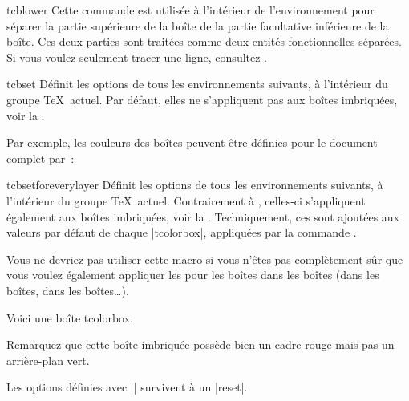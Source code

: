 \clearpage
\begin{docCommand}{tcblower}{}
  Cette commande est utilisée à l'intérieur de l'environnement  pour séparer la partie supérieure de la boîte de la partie facultative inférieure de la boîte. Ces deux parties sont traitées comme deux entités fonctionnelles séparées. Si vous voulez seulement tracer une ligne, consultez
  .
\end{docCommand}

\begin{docCommand}{tcbset}{}
  Définit les options de tous les environnements  suivants, à l'intérieur du groupe \TeX\ actuel.
  Par défaut, elles ne s'appliquent pas aux boîtes imbriquées, voir la .\par
  Par exemple, les couleurs des boîtes peuvent être définies pour le document complet par~:
\begin{dispListing}
\end{dispListing}
\end{docCommand}


\begin{docCommand}{tcbsetforeverylayer}{}
  Définit les options de tous les environnements  suivants, à l'intérieur du groupe \TeX\ actuel.
  Contrairement à , celles-ci s'appliquent également aux boîtes imbriquées, voir la .
  Techniquement, ces  sont ajoutées aux valeurs par défaut de chaque |tcolorbox|, appliquées par la commande .\par
  Vous ne devriez pas utiliser cette macro si vous n'êtes pas complètement sûr que vous voulez également appliquer les  pour les boîtes dans les boîtes (dans les boîtes, dans les boîtes\ldots).
\begin{dispExample}

\begin{tcolorbox}[title=Toutes les options pour cette boîte]
  Voici une boîte tcolorbox.\par\medskip
  \begin{tcolorbox}[title=Boîte imbriquée]
    Remarquez que cette boîte imbriquée possède bien un cadre rouge mais pas un arrière-plan vert.
  \end{tcolorbox}
\end{tcolorbox}
\bigskip

\begin{tcolorbox}[reset]
  Les options définies avec |\tcbsetforeverylayer| survivent à un |reset|.
\end{tcolorbox}
\end{dispExample}
\end{docCommand}


